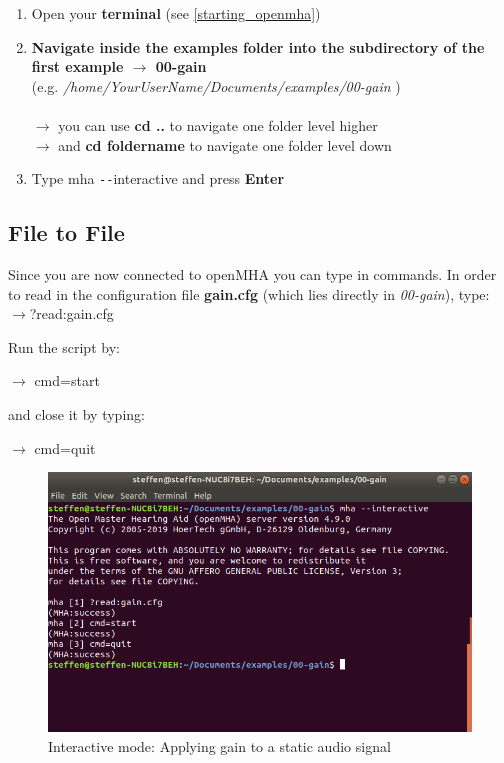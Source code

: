 \documentclass[11pt,a4paper,twoside]{article}
\newcommand{\+}{\discretionary{\mbox{\scriptsize$\hookleftarrow$}}{}{}}
\begin{document}
{{{\begin{enumerate}
    
    \item Open your \textbf{terminal} (see \ref{starting_openmha})
    \item \textbf{Navigate inside the examples folder into the subdirectory of the first example $\rightarrow$ \textbf{00-gain}} \\ (e.g. \textit{/home/YourUserName/Documents/examples/00-gain} )\\ \\
    $\rightarrow$ you can use \textbf{cd ..} to navigate one folder level higher \\
    $\rightarrow$ and \textbf{cd foldername} to navigate one folder level down
    \item Type {{\ttfamily mha \texttt{-{}-}interactive}} and press \textbf{Enter}
\end{enumerate}

\subsection{File to File}

Since you are now connected to openMHA you can type in commands. In order to read in the configuration file \textbf{gain.cfg} (which lies directly in \textit{00-gain}), type: \\

$\rightarrow${\ttfamily ?read:gain.cfg}


Run the script by:

$\rightarrow$ {\ttfamily cmd=start}

and close it by typing:

$\rightarrow$ {\ttfamily cmd=quit} 
\\

\begin{figure}[H]
\centering
\includegraphics[scale=0.4]{static_gain.png}
\caption{Interactive mode: Applying gain to a static audio signal}
\end{figure}

}}}
\end{document}
